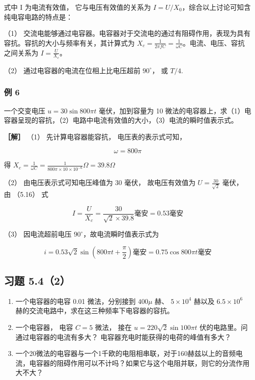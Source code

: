 式中 I 为电流有效值， 它与电压有效值的关系为
\(I = U / X_{0}\)，综合以上讨论可知含纯电容电路的特点是：

（1）
交流电能够通过电容器。电容器对于交流电的通过有阻碍作用，表现为具有容抗。容抗的大小与频率有关，其计算式为
\(X_{c} = \frac{1}{2\pi fC} = \frac{1}{\omega C}\)。电流、电压、容抗之间关系为
\(I = \frac{U}{X_c}\)。

（2） 通过电容器的电流在位相上比电压超前 \(90^{\circ}\)， 或 \(T / 4\).

\subsubsection{例 6}\label{ux4f8b-6-3}

一个交变电压 \(u=30\sin800\pi t\) 毫伏，加到容量为 10
微法的电容器上，求（1）电容器呈现的容抗，（2）电路中电流有效值的大小，（3）电流的瞬时值表示式。

\textbf{［解］} （1） 先计算电容器能容抗， 电压表的表示式可知，

\[
\omega = 800 \pi
\]

得
\(X_{c}=\frac{1}{\omega C}=\frac{1}{800\pi\times10\times10^{-6}}\Omega=39.8\Omega\)

（2） 由电压表示式可知电压峰值为 30 毫伏， 故电压有效值为
\(U = \frac{30}{\sqrt{2}}\) 毫伏， 由 （5.16） 式

\[
I = \frac{U}{X_{c}} = \frac{30}{\sqrt{2} \times 39.8} \text{毫安} = 0.53 \text{毫安}
\]

（3） 因电流超前电压 \(90^{\circ}\)，故电流瞬时值表示式为

\[
i = 0.53 \sqrt{2} \sin \left(800\pi t+\frac{\pi}{2}\right) \text{毫安} = 0.75 \cos 800 \pi t \text{毫安}
\]

\subsection{习题 5.4（2）}\label{ux4e60ux9898-5.42}

\begin{enumerate}
\def\labelenumi{\arabic{enumi}.}
\item
  一个电容器的电容 0.01 微法，分别接到 \(400 \mu\) 赫、
  \(5 \times 10^{4}\) 赫以及 \(6.5 \times 10^{6}\)
  赫的交流电路中，求在这三种频率下电容器的容抗。
\item
  一个电容器， 电容 \(C = 5\) 微法， 接在
  \(u = 220\sqrt{2}\sin 100\pi t\)
  伏的电路里。问通过电容器的电流有多大？
  电容器充电时能获得的电荷的峰值有多大？
\item
  一个20微法的电容器与一个1千欧的电阻相串联，对于160赫兹以上的音频电流，电容器的阻碍作用可以不计吗？如果它与这个电阻并联，则它的分流作用大不大？
\end{enumerate}


